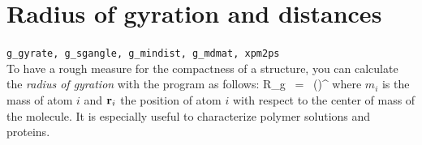 
\section{Radius of gyration and distances}
\label{sec:rg}
{\tt g\_gyrate, g\_sgangle, g\_mindist, g\_mdmat, xpm2ps}\\
To have a rough measure for the compactness of a structure, you can calculate 
the {\em radius of gyration} with the program {\tt {}} as follows:
\beq
R_g ~=~ \left({}\right)^{\half}
\label{eqn:rg}
\eeq
where $m_i$ is the mass of atom $i$ and ${\bf r}_i$ the position of 
atom $i$ with respect to the center of mass of the molecule. It is especially 
useful to characterize polymer solutions and proteins.

